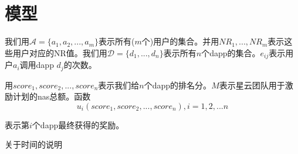 \section{模型}
我们用$\mathcal{A}=\{a_1,a_2,...,a_m\}$表示所有($m$个)用户的集合。并用$NR_1,...,NR_m$表示这些用户对应的NR值。我们用$\mathcal{D}=\{d_1,...,d_n\}$表示所有$n$个dapp的集合。$e_{ij}$表示用户$a_i$调用dapp $d_j$的次数。

用$score_1,score_2,...,score_n$表示我们给$n$个dapp的排名分。$M$表示星云团队用于激励计划的nas总额。函数
$$u_i(score_1,score_2,...,score_n),i=1,2,...n$$

表示第$i$个dapp最终获得的奖励。

{\color{red} 关于时间的说明}


